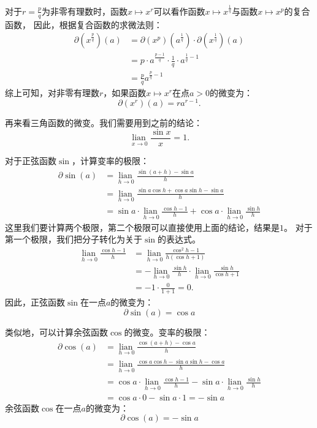 \documentclass[12pt,UTF8]{ctexbook}
\newcommand{\lian}[1]{
    \underset{#1}{\operatorname{lian}\,}
}
\theoremstyle{definition}
\theoremstyle{plain}
\begin{document}
对于$r = \frac{p}{q}$为非零有理数时，函数$x \mapsto x^r$可以看作函数$x \mapsto x^{\frac{1}{q}}$与函数$x \mapsto x^{p}$的复合函数，
因此，根据复合函数的求微法则：
\begin{align*}
    \partial (x^{\frac{p}{q}}) (a) &= \partial (x^p) (a^{\frac{1}{q}}) \cdot \partial (x^{\frac{1}{q}}) (a)  \\
    &= p \cdot a^{\frac{p - 1}{q}} \cdot \frac{1}{q} \cdot a^{\frac{1}{q} - 1}  \\
    &= \frac{p}{q} a^{\frac{p}{q} - 1}     
\end{align*}
综上可知，对非零有理数$r$，如果函数$x \mapsto x^r$在点$a>0$的微变为：
$$ \partial (x^r) (a) = r a^{r-1}. $$

再来看三角函数的微变。我们需要用到之前的结论：
$$ \lian{x\to 0} \frac{\sin{x}}{x} = 1.$$

对于正弦函数$\sin$，计算变率的极限：
\begin{align*}
    \partial \sin(a) &= \lian{h\to 0} \frac{\sin{(a + h)} - \sin{a}}{h}  \\
    &= \lian{h\to 0} \frac{\sin{a}\cos{h} + \cos{a}\sin{h} - \sin{a}}{h}  \\
    &= \sin{a} \cdot \lian{h\to 0} \frac{\cos{h} - 1}{h} + \cos{a} \cdot \lian{h\to 0}\frac{\sin{h}}{h} 
\end{align*}
这里我们要计算两个极限，第二个极限可以直接使用上面的结论，结果是$1$。
对于第一个极限，我们把分子转化为关于$\sin$的表达式。
\begin{align*}
    \lian{h\to 0} \frac{\cos{h} - 1}{h} &= \lian{h\to 0} \frac{\cos^2{h} - 1}{h(\cos{h} + 1)}  \\
    &= -\lian{h\to 0} \frac{\sin{h}}{h} \cdot \lian{h\to 0} \frac{\sin{h}}{\cos{h} + 1}  \\
    &= -1 \cdot \frac{0}{1 + 1} = 0.  
\end{align*}
因此，正弦函数$\sin$在一点$a$的微变为：
$$ \partial \sin(a) = \cos{a} $$

类似地，可以计算余弦函数$\cos$的微变。变率的极限：
\begin{align*}
    \partial \cos(a) &= \lian{h\to 0} \frac{\cos{(a + h)} - \cos{a}}{h}  \\
    &= \lian{h\to 0} \frac{\cos{a}\cos{h} - \sin{a}\sin{h} - \cos{a}}{h}  \\
    &= \cos{a} \cdot \lian{h\to 0} \frac{\cos{h} - 1}{h} - \sin{a} \cdot\lian{h\to 0}\frac{\sin{h}}{h}  \\
    &= \cos{a} \cdot 0 - \sin{a} \cdot 1 = -\sin{a} 
\end{align*}
余弦函数$\cos$在一点$a$的微变为：
$$ \partial \cos(a) = -\sin{a} $$
\end{document}
